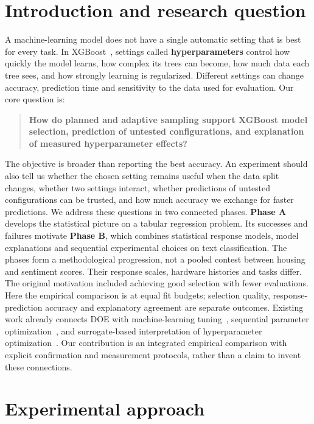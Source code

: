 \documentclass[12pt,a4paper]{article}
\newcommand{\term}[1]{\textbf{#1}}
\begin{document}
\section{Introduction and research question}
A machine-learning model does not have a single automatic setting that is best for every task. In XGBoost~\cite{xgboost}, settings called \term{hyperparameters} control how quickly the model learns, how complex its trees can become, how much data each tree sees, and how strongly learning is regularized. Different settings can change accuracy, prediction time and sensitivity to the data used for evaluation.
Our core question is:
\begin{quote}\textbf{How do planned and adaptive sampling support XGBoost model selection, prediction of untested configurations, and explanation of measured hyperparameter effects?}\end{quote}
The objective is broader than reporting the best accuracy. An experiment should also tell us whether the chosen setting remains useful when the data split changes, whether two settings interact, whether predictions of untested configurations can be trusted, and how much accuracy we exchange for faster predictions.
We address these questions in two connected phases. \term{Phase A} develops the statistical picture on a tabular regression problem. Its successes and failures motivate \term{Phase B}, which combines statistical response models, model explanations and sequential experimental choices on text classification. The phases form a methodological progression, not a pooled contest between housing and sentiment scores. Their response scales, hardware histories and tasks differ.
The original motivation included achieving good selection with fewer evaluations. Here the empirical comparison is at equal fit budgets; selection quality, response-prediction accuracy and explanatory agreement are separate outcomes. Existing work already connects DOE with machine-learning tuning~\cite{lujan}, sequential parameter optimization~\cite{spo}, and surrogate-based interpretation of hyperparameter optimization~\cite{moosbauer,fanova}. Our contribution is an integrated empirical comparison with explicit confirmation and measurement protocols, rather than a claim to invent these connections.
\section{Experimental approach}
\end{document}
